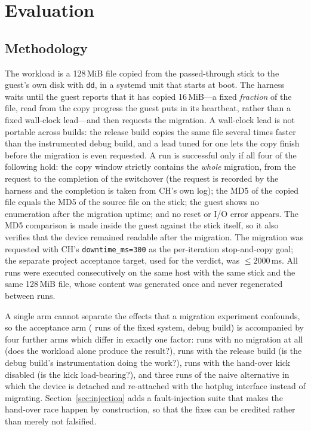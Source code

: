 \documentclass[10pt,conference]{IEEEtran}
\newcommand{\code}[1]{\texttt{#1}}
\begin{document}
\section{Evaluation}
\label{sec:evaluation}

\subsection{Methodology}
The workload is a 128\,MiB file copied from the passed-through stick to the
guest's own disk with \code{dd}, in a systemd unit that starts at boot. The
harness waits until the guest reports that it has copied 16\,MiB---a fixed
\emph{fraction} of the file, read from the copy progress the guest puts in its
heartbeat, rather than a fixed wall-clock lead---and then requests the
migration. A wall-clock lead is not portable across builds: the release build
copies the same file several times faster than the instrumented debug build, and
a lead tuned for one lets the copy finish before the migration is even requested.
A run is successful only if
all four of the following hold: the copy window strictly contains the
\emph{whole} migration, from the request to the completion of the switchover
(the request is recorded by the harness and the completion is taken from CH's own log); the MD5 of the copied file equals the MD5 of
the source file on the stick; the guest shows no enumeration after the migration
uptime; and no reset or I/O error appears. The MD5 comparison is made inside the
guest against the stick itself, so it also verifies that the device remained
readable after the migration. The migration was requested with CH's
\code{downtime\_ms=300} as the per-iteration stop-and-copy goal; the separate
project acceptance target, used for the verdict, was $\le 2000$\,ms. All runs
were executed consecutively on the same host with the same stick and the same
128\,MiB file, whose content was generated once and never regenerated between
runs.

A single arm cannot separate the effects that a migration experiment confounds,
so the acceptance arm (\TotalRuns{} runs of the fixed system, debug build) is
accompanied by four further arms which differ in exactly one factor:
\ControlRuns{} runs with no migration at all (does the workload alone produce the
result?), \ReleaseRuns{} runs with the release build (is the debug build's
instrumentation doing the work?), \KickOffRuns{} runs with the hand-over kick
disabled (is the kick load-bearing?), and three runs of the naive alternative in
which the device is detached and re-attached with the hotplug interface instead
of migrating. Section~\ref{sec:injection} adds a fault-injection suite that
makes the hand-over race happen by construction, so that the fixes can be
credited rather than merely not falsified.
\end{document}
